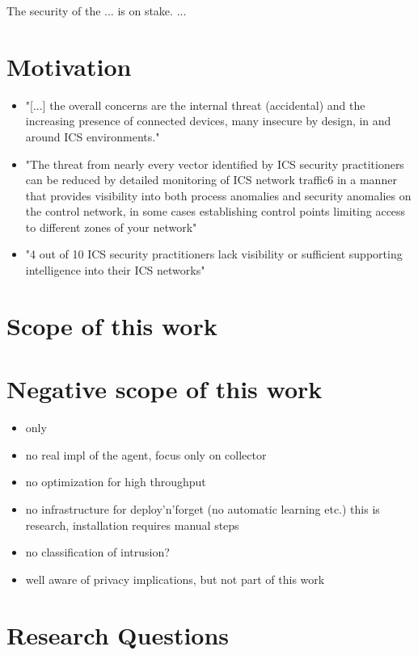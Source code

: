 
The security of the ... is on stake.
...

\section{Motivation}
\begin{itemize}
	\item "[...] the overall concerns are the internal threat (accidental) and the increasing presence of connected devices, many insecure by design, in and around ICS environments." \parencite[p.~9]{Gregory-Brown2017}
	\item "The threat from nearly every vector identified by ICS security practitioners can be reduced by detailed monitoring of ICS network traffic6 in a manner that provides visibility into both process anomalies and security anomalies on the control network, in some cases establishing control points limiting access to different zones of your network" \parencite[p.~10]{Gregory-Brown2017}
	\item "4 out of 10 ICS security practitioners lack visibility or sufficient supporting intelligence into their ICS networks" \parencite[p.~13]{Gregory-Brown2017}
\end{itemize}

\section{Scope of this work}

\section{Negative scope of this work}
\begin{itemize}
	\item only \knx
	\item no real impl of the agent, focus only on collector
	\item no optimization for high throughput
	\item no infrastructure for deploy'n'forget (no automatic learning etc.)
		\subitem this is research, installation requires manual steps
	\item no classification of intrusion?
	\item well aware of privacy implications, but not part of this work
\end{itemize}

\section{Research Questions}

